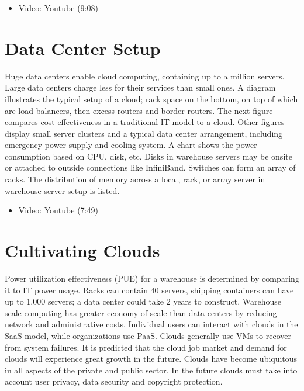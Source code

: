 \begin{itemize}
\tightlist
\item
  Video: \href{https://www.youtube.com/watch?v=cwtWpZcWuQ0}{Youtube}
  (9:08)
\end{itemize}

\section{Data Center Setup}\label{data-center-setup}

Huge data centers enable cloud computing, containing up to a million
servers. Large data centers charge less for their services than small
ones. A diagram illustrates the typical setup of a cloud; rack space on
the bottom, on top of which are load balancers, then excess routers and
border routers. The next figure compares cost effectiveness in a
traditional IT model to a cloud. Other figures display small server
clusters and a typical data center arrangement, including emergency
power supply and cooling system. A chart shows the power consumption
based on CPU, disk, etc. Disks in warehouse servers may be onsite or
attached to outside connections like InfiniBand. Switches can form an
array of racks. The distribution of memory across a local, rack, or
array server in warehouse server setup is listed.

\begin{itemize}
\tightlist
\item
  Video: \href{https://www.youtube.com/watch?v=zBVtXzqF2ew}{Youtube}
  (7:49)
\end{itemize}

\section{Cultivating Clouds}\label{cultivating-clouds}

Power utilization effectiveness (PUE) for a warehouse is determined by
comparing it to IT power usage. Racks can contain 40 servers, shipping
containers can have up to 1,000 servers; a data center could take 2
years to construct. Warehouse scale computing has greater economy of
scale than data centers by reducing network and administrative costs.
Individual users can interact with clouds in the SaaS model, while
organizations use PaaS. Clouds generally use VMs to recover from system
failures. It is predicted that the cloud job market and demand for
clouds will experience great growth in the future. Clouds have become
ubiquitous in all aspects of the private and public sector. In the
future clouds must take into account user privacy, data security and
copyright protection.


